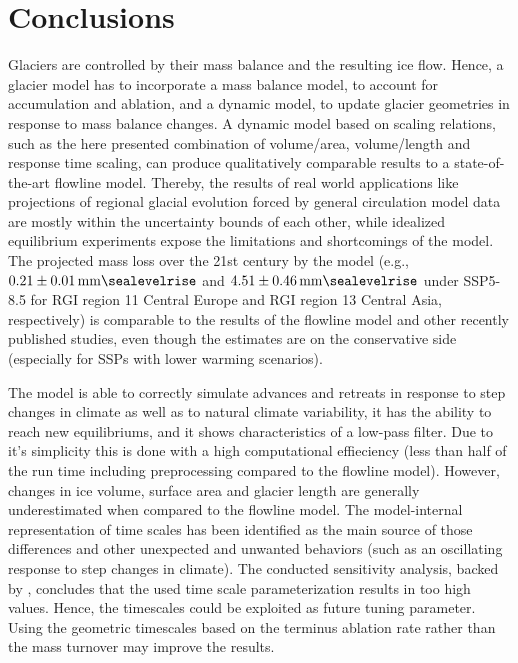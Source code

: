 \chapter{Conclusions}\label{chap:conclusions}
\thispagestyle{plain}


Glaciers are controlled by their mass balance and the resulting ice flow. Hence, a glacier model has to incorporate a mass balance model, to account for accumulation and ablation, and a dynamic model, to update glacier geometries in response to mass balance changes. A dynamic model based on scaling relations, such as the here presented combination of volume/area, volume/length and response time scaling, can produce qualitatively comparable results to a state-of-the-art flowline model. Thereby, the results of real world applications like projections of regional glacial evolution forced by general circulation model data are mostly within the uncertainty bounds of each other, while idealized equilibrium experiments expose the limitations and shortcomings of the \vas{} model. The projected mass loss over the 21st century by the \vas{} model (e.g., $0.21\SI{\pm0.01}{\milli\meter\sealevelrise}$ and $4.51\SI{\pm0.46}{\milli\meter\sealevelrise}$ under SSP5-8.5 for RGI region 11 Central Europe  and RGI region 13 Central Asia, respectively) is comparable to the results of the flowline model and other recently published studies, even though the estimates are on the conservative side (especially for SSPs with lower warming scenarios).

The \vas{} model is able to correctly simulate advances and retreats in response to step changes in climate as well as to natural climate variability, it has the ability to reach new equilibriums, and it shows characteristics of a low-pass filter. Due to it's simplicity this is done with a high computational effieciency (less than half of the run time including preprocessing compared to the flowline model). However, changes in ice volume, surface area and glacier length are generally underestimated when compared to the flowline model. The model-internal representation of time scales has been identified as the main source of those differences and other unexpected and unwanted behaviors (such as an oscillating response to step changes in climate). The conducted sensitivity analysis, backed by \citet{Roe2020}, concludes that the used time scale parameterization results in too high values. Hence, the timescales could be exploited as future tuning parameter. Using the geometric timescales based on the terminus ablation rate \citep{Johannesson1989} rather than the mass turnover may improve the results.

